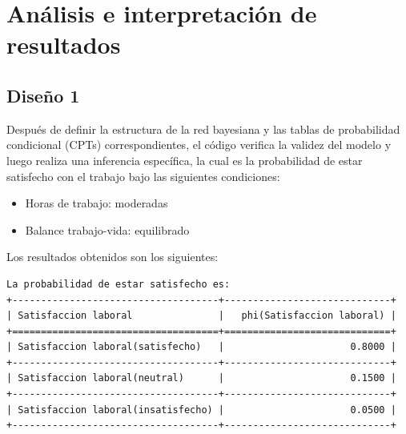 \section{Análisis e interpretación de resultados}

\subsection{Diseño 1}
Después de definir la estructura de la red bayesiana y las tablas de probabilidad condicional (CPTs) correspondientes, el código verifica la validez del modelo y luego realiza una inferencia específica, la cual es la probabilidad de estar satisfecho con el trabajo bajo las siguientes condiciones:

\begin{itemize}
    \item Horas de trabajo: moderadas
    \item Balance trabajo-vida: equilibrado
\end{itemize}

Los resultados obtenidos son los siguientes:

\begin{lstlisting}
La probabilidad de estar satisfecho es:
+------------------------------------+-----------------------------+
| Satisfaccion laboral               |   phi(Satisfaccion laboral) |
+====================================+=============================+
| Satisfaccion laboral(satisfecho)   |                      0.8000 |
+------------------------------------+-----------------------------+
| Satisfaccion laboral(neutral)      |                      0.1500 |
+------------------------------------+-----------------------------+
| Satisfaccion laboral(insatisfecho) |                      0.0500 |
+------------------------------------+-----------------------------+
\end{lstlisting}

